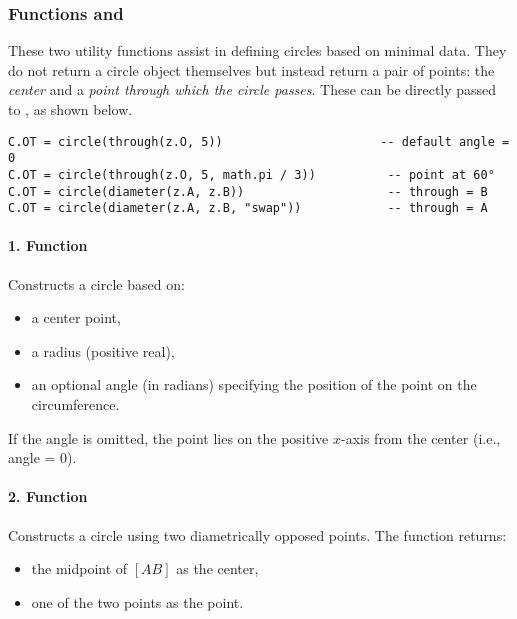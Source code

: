\subsubsection{Functions  and }
\label{ssub:function_code_through_and_code_diameter}

These two utility functions assist in defining circles based on minimal data. They do not return a circle object themselves but instead return a pair of points: the \emph{center} and a \emph{point through which the circle passes}. These can be directly passed to , as shown below.

\begin{mybox}
\begin{verbatim}
C.OT = circle(through(z.O, 5))                      -- default angle = 0
C.OT = circle(through(z.O, 5, math.pi / 3))          -- point at 60°
C.OT = circle(diameter(z.A, z.B))                    -- through = B
C.OT = circle(diameter(z.A, z.B, "swap"))            -- through = A
\end{verbatim}
\end{mybox}

\paragraph{1. Function \code{through(center, radius, <angle>])}}
Constructs a circle based on:
\begin{itemize}
  \item a center point,
  \item a radius (positive real),
  \item an optional angle (in radians) specifying the position of the point on the circumference.
\end{itemize}
If the angle is omitted, the point lies on the positive \(x\)-axis from the center (i.e., angle = 0).

\paragraph{2. Function }

Constructs a circle using two diametrically opposed points. The function returns:

\begin{itemize}
  \item the midpoint of \([AB]\) as the center,
  \item one of the two points as the  point.
\end{itemize}

